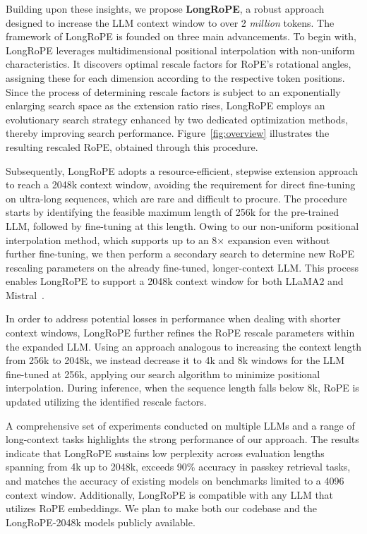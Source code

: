 Building upon these insights, we propose \textbf{LongRoPE}, a robust approach designed to increase the LLM context window to over 2 \emph{million} tokens. The framework of LongRoPE is founded on three main advancements. To begin with, LongRoPE leverages multidimensional positional interpolation with non-uniform characteristics. It discovers optimal rescale factors for RoPE's rotational angles, assigning these for each dimension according to the respective token positions. Since the process of determining rescale factors is subject to an exponentially enlarging search space as the extension ratio rises, LongRoPE employs an evolutionary search strategy enhanced by two dedicated optimization methods, thereby improving search performance. Figure~\ref{fig:overview} illustrates the resulting rescaled RoPE, obtained through this procedure.

Subsequently, {LongRoPE} adopts a resource-efficient, stepwise extension approach to reach a 2048k context window, avoiding the requirement for direct fine-tuning on ultra-long sequences, which are rare and difficult to procure. The procedure starts by identifying the feasible maximum length of 256k for the pre-trained LLM, followed by fine-tuning at this length. Owing to our non-uniform positional interpolation method, which supports up to an 8$\times$ expansion even without further fine-tuning, we then perform a secondary search to determine new RoPE rescaling parameters on the already fine-tuned, longer-context LLM. This process enables {LongRoPE} to support a 2048k context window for both LLaMA2 and Mistral~\cite{mistral}.

In order to address potential losses in performance when dealing with shorter context windows, {LongRoPE} further refines the RoPE rescale parameters within the expanded LLM. Using an approach analogous to increasing the context length from 256k to 2048k, we instead decrease it to 4k and 8k windows for the LLM fine-tuned at 256k, applying our search algorithm to minimize positional interpolation. During inference, when the sequence length falls below 8k, RoPE is updated utilizing the identified rescale factors.

A comprehensive set of experiments conducted on multiple LLMs and a range of long-context tasks highlights the strong performance of our approach. The results indicate that LongRoPE sustains low perplexity across evaluation lengths spanning from 4k up to 2048k, exceeds 90\% accuracy in passkey retrieval tasks, and matches the accuracy of existing models on benchmarks limited to a 4096 context window. Additionally, LongRoPE is compatible with any LLM that utilizes RoPE embeddings. We plan to make both our codebase and the LongRoPE-2048k models publicly available.

